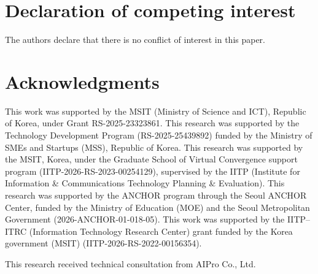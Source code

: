 \documentclass[final,3p,times,twocolumn]{elsarticle}
\begin{document}

\section*{Declaration of competing interest}
The authors declare that there is no conflict of interest in this paper.

\section*{Acknowledgments}

This work was supported by the MSIT (Ministry of Science and ICT),
Republic of Korea, under Grant RS-2025-23323861. This research was
supported by the Technology Development Program (RS-2025-25439892)
funded by the Ministry of SMEs and Startups (MSS), Republic of Korea.
This research was supported by the MSIT, Korea, under the Graduate
School of Virtual Convergence support program
(IITP-2026-RS-2023-00254129), supervised by the IITP (Institute for
Information \& Communications Technology Planning \& Evaluation). This
research was supported by the ANCHOR program through the Seoul ANCHOR
Center, funded by the Ministry of Education (MOE) and the Seoul
Metropolitan Government (2026-ANCHOR-01-018-05). This work was
supported by the IITP--ITRC (Information Technology Research Center)
grant funded by the Korea government (MSIT) (IITP-2026-RS-2022-00156354).

This research received technical consultation from AIPro Co., Ltd.
\end{document}
